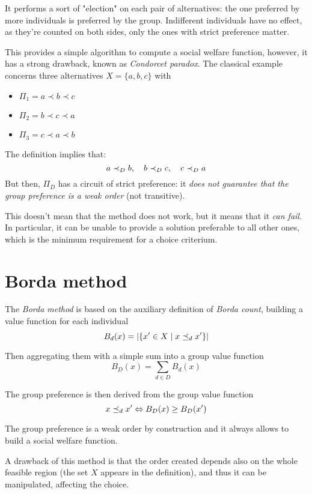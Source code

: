 It performs a sort of "election" on each pair of alternatives: the one preferred by more individuals is preferred by the group. Indifferent individuals have no effect, as they're counted on both sides, only the ones with strict preference matter.

This provides a simple algorithm to compute a social welfare function, however, it has a strong drawback, known as \textit{Condorcet paradox}. The classical example concerns three alternatives $X = \{a, b, c\}$ with
\begin{itemize}
	\item $\Pi_1 = a \prec b \prec c$
	
	\item $\Pi_2 = b \prec c \prec a$
	
	\item $\Pi_3 = c \prec a \prec b$
\end{itemize}

The definition implies that:
$$ a \prec_{D} b, \quad b \prec_{D} c, \quad c \prec_{D} a$$
But then, $\Pi_D$ has a circuit of strict preference: it \textit{does not guarantee that the group preference is a weak order} (not transitive).

This doesn't mean that the method does not work, but it means that it \textit{can fail}. In particular, it can be unable to provide a solution preferable to all other ones, which is the minimum requirement for a choice criterium.

\section{Borda method}

The \textit{Borda method} is based on the auxiliary definition of \textit{Borda count}, building a value function for each individual
$$ B_d (x) = \left|\left\{x' \in X \mid x \preceq_{d} x' \right\}\right|$$

Then aggregating them with a simple sum into a group value function
$$ B_D (x) = \sum_{d \in D} B_d (x) $$

The group preference is then derived from the group value function
$$ x \preceq_{d} x' \Leftrightarrow B_D (x) \geq B_D (x') $$

The group preference is a weak order by construction and it always allows to build a social welfare function.

A drawback of this method is that the order created depends also on the whole feasible region (the set $X$ appears in the definition), and thus it can be manipulated, affecting the choice.

